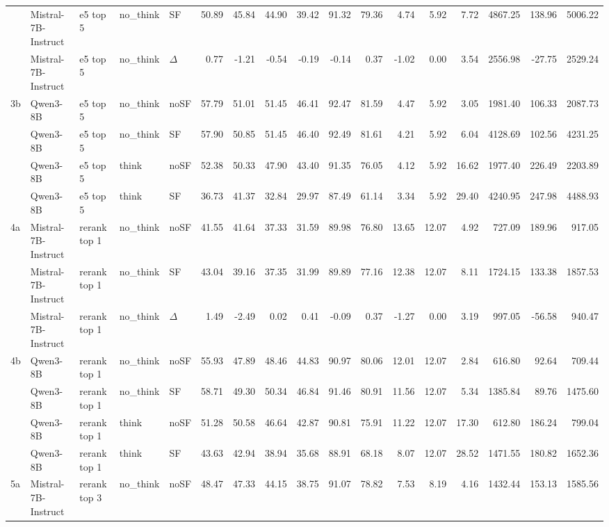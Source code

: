 \begin{landscape}
\begin{footnotesize}
\begin{longtable}{l l l l l r r r r r r r r r r r r}
 & Mistral-7B-Instruct & e5 top 5 & no\_think & SF & 50.89 & 45.84 & 44.90 & 39.42 & 91.32 & 79.36 & 4.74 & 5.92 & 7.72 & 4867.25 & 138.96 & 5006.22 \\
 & Mistral-7B-Instruct & e5 top 5 & no\_think & $\Delta$ & 0.77 & -1.21 & -0.54 & -0.19 & -0.14 & 0.37 & -1.02 & 0.00 & 3.54 & 2556.98 & -27.75 & 2529.24 \\
3b & Qwen3-8B & e5 top 5 & no\_think & noSF & 57.79 & 51.01 & 51.45 & 46.41 & 92.47 & 81.59 & 4.47 & 5.92 & 3.05 & 1981.40 & 106.33 & 2087.73 \\
 & Qwen3-8B & e5 top 5 & no\_think & SF & 57.90 & 50.85 & 51.45 & 46.40 & 92.49 & 81.61 & 4.21 & 5.92 & 6.04 & 4128.69 & 102.56 & 4231.25 \\
 & Qwen3-8B & e5 top 5 & think & noSF & 52.38 & 50.33 & 47.90 & 43.40 & 91.35 & 76.05 & 4.12 & 5.92 & 16.62 & 1977.40 & 226.49 & 2203.89 \\
 & Qwen3-8B & e5 top 5 & think & SF & 36.73 & 41.37 & 32.84 & 29.97 & 87.49 & 61.14 & 3.34 & 5.92 & 29.40 & 4240.95 & 247.98 & 4488.93 \\
\midrule
4a & Mistral-7B-Instruct & rerank top 1 & no\_think & noSF & 41.55 & 41.64 & 37.33 & 31.59 & 89.98 & 76.80 & 13.65 & 12.07 & 4.92 & 727.09 & 189.96 & 917.05 \\
 & Mistral-7B-Instruct & rerank top 1 & no\_think & SF & 43.04 & 39.16 & 37.35 & 31.99 & 89.89 & 77.16 & 12.38 & 12.07 & 8.11 & 1724.15 & 133.38 & 1857.53 \\
 & Mistral-7B-Instruct & rerank top 1 & no\_think & $\Delta$ & 1.49 & -2.49 & 0.02 & 0.41 & -0.09 & 0.37 & -1.27 & 0.00 & 3.19 & 997.05 & -56.58 & 940.47 \\
4b & Qwen3-8B & rerank top 1 & no\_think & noSF & 55.93 & 47.89 & 48.46 & 44.83 & 90.97 & 80.06 & 12.01 & 12.07 & 2.84 & 616.80 & 92.64 & 709.44 \\
 & Qwen3-8B & rerank top 1 & no\_think & SF & 58.71 & 49.30 & 50.34 & 46.84 & 91.46 & 80.91 & 11.56 & 12.07 & 5.34 & 1385.84 & 89.76 & 1475.60 \\
 & Qwen3-8B & rerank top 1 & think & noSF & 51.28 & 50.58 & 46.64 & 42.87 & 90.81 & 75.91 & 11.22 & 12.07 & 17.30 & 612.80 & 186.24 & 799.04 \\
 & Qwen3-8B & rerank top 1 & think & SF & 43.63 & 42.94 & 38.94 & 35.68 & 88.91 & 68.18 & 8.07 & 12.07 & 28.52 & 1471.55 & 180.82 & 1652.36 \\
\midrule
5a & Mistral-7B-Instruct & rerank top 3 & no\_think & noSF & 48.47 & 47.33 & 44.15 & 38.75 & 91.07 & 78.82 & 7.53 & 8.19 & 4.16 & 1432.44 & 153.13 & 1585.56 \\

\end{longtable}
\end{footnotesize}
\end{landscape}
